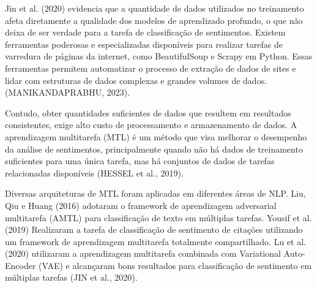 Jin et al. (2020) evidencia que a quantidade de dados utilizados no treinamento afeta diretamente a qualidade dos modelos de aprendizado profundo, o que não deixa de ser verdade para a tarefa de classificação de sentimentos. Existem ferramentas poderosas e especializadas disponíveis para realizar tarefas de varredura de páginas da internet, como BeautifulSoup e Scrapy em Python. Essas ferramentas permitem automatizar o processo de extração de dados de sites e lidar com estruturas de dados complexas e grandes volumes de dados. (MANIKANDAPRABHU, 2023).

Contudo, obter quantidades suficientes de dados que resultem em resultados consistentes, exige alto custo de processamento e armazenamento de dados. A aprendizagem multitarefa (MTL) é um método que visa melhorar o desempenho da análise de sentimentos, principalmente quando não há dados de treinamento suficientes para uma única tarefa, mas há conjuntos de dados de tarefas relacionadas disponíveis (HESSEL et al., 2019).

Diversas arquiteturas de MTL foram aplicadas em diferentes áreas de NLP. Liu, Qiu e Huang (2016) adotaram o framework de aprendizagem adversarial multitarefa (AMTL) para classificação de texto em múltiplas tarefas. Yousif et al. (2019) Realizaram a tarefa de classificação de sentimento de citações utilizando um framework de aprendizagem multitarefa totalmente compartilhado. Lu et al. (2020) utilizaram a aprendizagem multitarefa combinada com Variational Auto-Encoder (VAE) e alcançaram bons resultados para classificação de sentimento em múltiplas tarefas (JIN et al., 2020).


